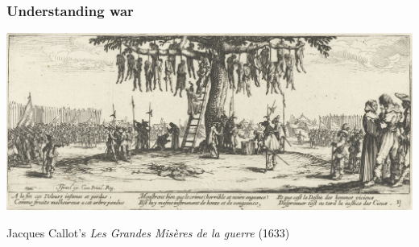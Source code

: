 \documentclass[aspectratio=43]{beamer}
\begin{document}
\begin{frame}
\frametitle{Understanding war}
\centering

\includegraphics[width = 1\textwidth]{img/Jacques_Callot_hanging}

\vspace{15pt}

{\footnotesize Jacques Callot's \textit{Les Grandes Misères de la guerre} (1633)}


\end{frame}
\end{document}
